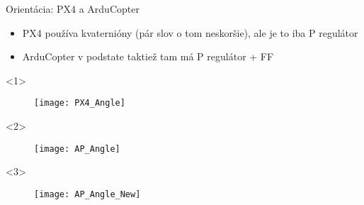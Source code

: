   \begin{frame}[t]{Orientácia: PX4 a ArduCopter}
\begin{itemize}
  \item<1-> PX4 používa kvaternióny (pár slov o tom neskoršie), ale je to iba P regulátor
  \item<2-> ArduCopter v podstate taktiež tam má P regulátor + FF
\end{itemize}

  \begin{onlyenv}<1>
  \begin{figure}
\centering
  \texttt{[image: PX4\_Angle]}\\
\end{figure}
\end{onlyenv}


  \begin{onlyenv}<2>
  \begin{figure}
\centering
  \texttt{[image: AP\_Angle]}\\
\end{figure}
\end{onlyenv}

  \begin{onlyenv}<3>
  \begin{figure}
\centering
  \texttt{[image: AP\_Angle\_New]}\\
\end{figure}
\end{onlyenv}

  \end{frame}

